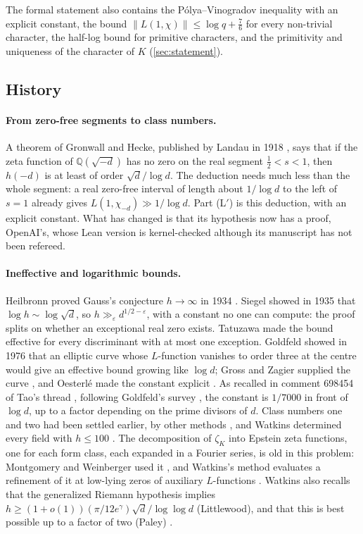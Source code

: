 \documentclass[11pt]{article}
\theoremstyle{definition}
\newcommand{\Q}{\mathbb{Q}}
\begin{document}
The formal statement also contains the Pólya--Vinogradov inequality with an explicit constant, the bound $\|L(1,\chi)\| \le \log q + \frac76$ for every non-trivial character, the half-log bound for primitive characters, and the primitivity and uniqueness of the character of $K$ (\cref{sec:statement}).

\subsection{History}\label{sec:history}

\paragraph{From zero-free segments to class numbers.} A theorem of Gronwall and Hecke, published by Landau in 1918 \cite{Landau1918}, says that if the zeta function of $\Q(\sqrt{-d})$ has no zero on the real segment $\frac12 < s < 1$, then $h(-d)$ is at least of order $\sqrt d/\log d$. The deduction needs much less than the whole segment: a real zero-free interval of length about $1/\log d$ to the left of $s = 1$ already gives $L(1,\chi_{-d}) \gg 1/\log d$. Part (L$'$) is this deduction, with an explicit constant. What has changed is that its hypothesis now has a proof, OpenAI's, whose Lean version is kernel-checked although its manuscript has not been refereed.

\paragraph{Ineffective and logarithmic bounds.} Heilbronn proved Gauss's conjecture $h \to \infty$ in 1934 \cite{Heilbronn1934}. Siegel showed in 1935 \cite{Siegel1935} that $\log h \sim \log\sqrt d$, so $h \gg_\varepsilon d^{1/2-\varepsilon}$, with a constant no one can compute: the proof splits on whether an exceptional real zero exists. Tatuzawa \cite{Tatuzawa1951} made the bound effective for every discriminant with at most one exception. Goldfeld showed in 1976 \cite{Goldfeld1976} that an elliptic curve whose $L$-function vanishes to order three at the centre would give an effective bound growing like $\log d$; Gross and Zagier supplied the curve \cite{GrossZagier1986}, and Oesterlé made the constant explicit \cite{Oesterle1985}. As recalled in comment 698454 of Tao's thread \cite{Tao2026}, following Goldfeld's survey \cite{Goldfeld1985}, the constant is $1/7000$ in front of $\log d$, up to a factor depending on the prime divisors of $d$. Class numbers one and two had been settled earlier, by other methods \cite{Heegner1952,Baker1966,Stark1967,Baker1971,Stark1971}, and Watkins determined every field with $h \le 100$ \cite{Watkins2004}. The decomposition of $\zeta_K$ into Epstein zeta functions, one for each form class, each expanded in a Fourier series, is old in this problem: Montgomery and Weinberger used it \cite{MontgomeryWeinberger1974}, and Watkins's method evaluates a refinement of it at low-lying zeros of auxiliary $L$-functions \cite[\S3]{Watkins2004}. Watkins also recalls that the generalized Riemann hypothesis implies $h \ge (1 + o(1))(\pi/12e^\gamma)\sqrt d/\log\log d$ (Littlewood), and that this is best possible up to a factor of two (Paley) \cite[p.~908]{Watkins2004}.
\end{document}
